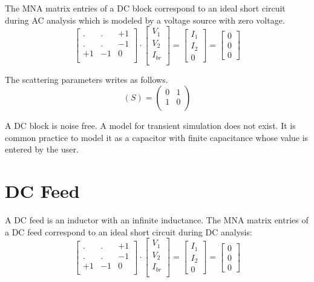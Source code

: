 \addvspace{12pt}

The MNA matrix entries of a DC block correspond to an ideal short
circuit during AC analysis which is modeled by a voltage source with
zero voltage.
\begin{equation}
\begin{bmatrix}
. & . & +1\\
. & . & -1\\
+1 & -1 & 0\\
\end{bmatrix}
\cdot
\begin{bmatrix}
V_1\\
V_2\\
I_{br}\\
\end{bmatrix}
=
\begin{bmatrix}
I_1\\
I_2\\
0
\end{bmatrix}
=
\begin{bmatrix}
0\\
0\\
0
\end{bmatrix}
\end{equation}

The scattering parameters writes as follows.
\begin{equation}
(S) =
\begin{pmatrix}
0 & 1\\
1 & 0\\
\end{pmatrix}
\end{equation}

A DC block is noise free. A model for transient simulation does not
exist. It is common practice to model it as a capacitor with finite
capacitance whose value is entered by the user.


\section{DC Feed}

A DC feed is an inductor with an infinite inductance. The MNA
matrix entries of a DC feed correspond to an ideal short
circuit during DC analysis:
\begin{equation}
\begin{bmatrix}
. & . & +1\\
. & . & -1\\
+1 & -1 & 0\\
\end{bmatrix}
\cdot
\begin{bmatrix}
V_1\\
V_2\\
I_{br}\\
\end{bmatrix}
=
\begin{bmatrix}
I_1\\
I_2\\
0
\end{bmatrix}
=
\begin{bmatrix}
0\\
0\\
0
\end{bmatrix}
\end{equation}

